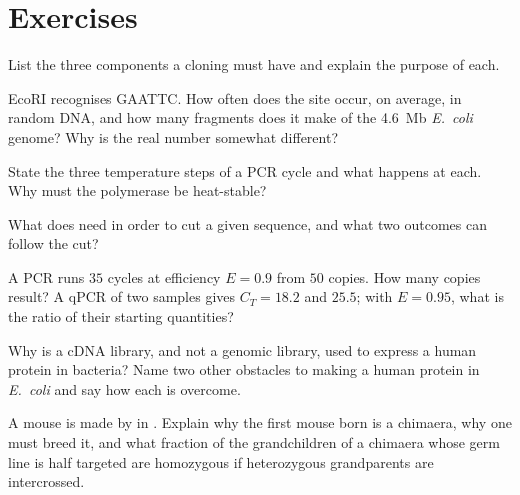 \section{Exercises}

\begin{exercise}[$\star$]\label{exo:b3:genetic-engineering:1}
List the three components a cloning  must have and explain the
purpose of each.
\end{exercise}

\begin{exercise}[$\star$]\label{exo:b3:genetic-engineering:2}
EcoRI recognises GAATTC. How often does the site occur, on average, in
random DNA, and how many fragments does it make of the \qty{4.6}{Mb}
\emph{E.~coli} genome? Why is the real number somewhat different?
\end{exercise}

\begin{exercise}[$\star$]\label{exo:b3:genetic-engineering:3}
State the three temperature steps of a PCR cycle and what happens at
each. Why must the polymerase be heat-stable?
\end{exercise}

\begin{exercise}[$\star$]\label{exo:b3:genetic-engineering:4}
What does  need in order to cut a given sequence, and what two
outcomes can follow the cut?
\end{exercise}

\begin{exercise}[$\star\star$]\label{exo:b3:genetic-engineering:5}
A PCR runs $35$ cycles at efficiency $E = 0.9$ from $50$ copies. How many
copies result? A qPCR of two samples gives $C_{T} = 18.2$ and $25.5$;
with $E = 0.95$, what is the ratio of their starting quantities?
\end{exercise}

\begin{exercise}[$\star\star$]\label{exo:b3:genetic-engineering:6}
Why is a cDNA library, and not a genomic library, used to express a
human protein in bacteria? Name two other obstacles to making a human
protein in \emph{E.~coli} and say how each is overcome.
\end{exercise}

\begin{exercise}[$\star\star$]\label{exo:b3:genetic-engineering:7}
A  mouse is made by  in .
Explain why the first mouse born is a chimaera, why one must breed it,
and what fraction of the grandchildren of a chimaera whose germ line is
half targeted are homozygous  if heterozygous grandparents are
intercrossed.
\end{exercise}

